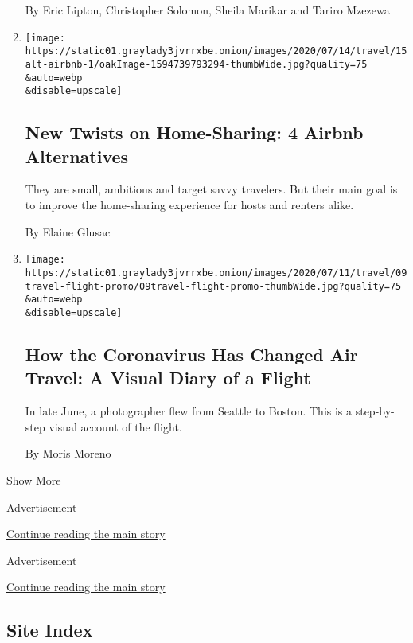 \begin{enumerate}
  By Eric Lipton, Christopher Solomon, Sheila Marikar and Tariro Mzezewa
\item
  \href{/2020/07/15/travel/airbnb-alternatives-home-sharing.html}{}

  \texttt{[image: https://static01.graylady3jvrrxbe.onion/images/2020/07/14/travel/15alt-airbnb-1/oakImage-1594739793294-thumbWide.jpg?quality=75\\\&auto=webp\\\&disable=upscale]}

  \hypertarget{new-twists-on-home-sharing-4-airbnb-alternatives}{%
  \subsection{New Twists on Home-Sharing: 4 Airbnb
  Alternatives}\label{new-twists-on-home-sharing-4-airbnb-alternatives}}

  They are small, ambitious and target savvy travelers. But their main
  goal is to improve the home-sharing experience for hosts and renters
  alike.

  By Elaine Glusac
\item
  \href{/interactive/2020/07/09/travel/coronavirus-air-travel-visual-diary.html}{}

  \texttt{[image: https://static01.graylady3jvrrxbe.onion/images/2020/07/11/travel/09travel-flight-promo/09travel-flight-promo-thumbWide.jpg?quality=75\\\&auto=webp\\\&disable=upscale]}

  \hypertarget{how-the-coronavirus-has-changed-air-travel-a-visual-diary-of-a-flight}{%
  \subsection{How the Coronavirus Has Changed Air Travel: A Visual Diary
  of a
  Flight}\label{how-the-coronavirus-has-changed-air-travel-a-visual-diary-of-a-flight}}

  In late June, a photographer flew from Seattle to Boston. This is a
  step-by-step visual account of the flight.

  By Moris Moreno
\end{enumerate}

Show More

Advertisement

\protect\hyperlink{after-mid2}{Continue reading the main story}

Advertisement

\protect\hyperlink{after-mktg}{Continue reading the main story}

\hypertarget{site-index}{%
\subsection{Site Index}\label{site-index}}

